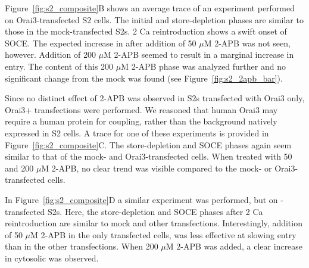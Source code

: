 Figure~\ref{fig:s2_composite}B shows an average trace of an experiment performed on Orai3-transfected S2 cells. The initial and store-depletion phases are similar to those in the mock-transfected S2s. 2 Ca reintroduction shows a swift onset of SOCE. The expected increase in \Ca{} after addition of 50 $\mu$M 2-APB was not seen, however. Addition of 200 $\mu$M 2-APB seemed to result in a marginal increase in \Ca{} entry. The \Ca{} content of this 200 $\mu$M 2-APB phase was analyzed further and no significant change from the mock was found (see Figure~\ref{fig:s2_2apb_bar}).


Since no distinct effect of 2-APB was observed in S2s transfected with Orai3 only, Orai3+\stim{} transfections were performed. We reasoned that human Orai3 may require a human \stim{} protein for coupling, rather than the background \dstim{} natively expressed in S2 cells. A trace for one of these experiments is provided in Figure~\ref{fig:s2_composite}C. 
The store-depletion and SOCE phases again seem similar to that of the mock- and Orai3-transfected cells. When treated with 50 and 200 $\mu$M 2-APB, no clear trend was visible compared to the mock- or Orai3-transfected cells.

In Figure~\ref{fig:s2_composite}D a similar experiment was performed, but on \stim{}-transfected  S2s. 
Here, the store-depletion and SOCE phases after 2 Ca reintroduction are similar to mock and other transfections. Interestingly, addition of 50 $\mu$M 2-APB in the \stim{} only transfected cells, was less effective at slowing \Ca{} entry than in the other transfections. %
When 200 $\mu$M 2-APB was added, a clear increase in cytosolic \Ca{} was observed.



